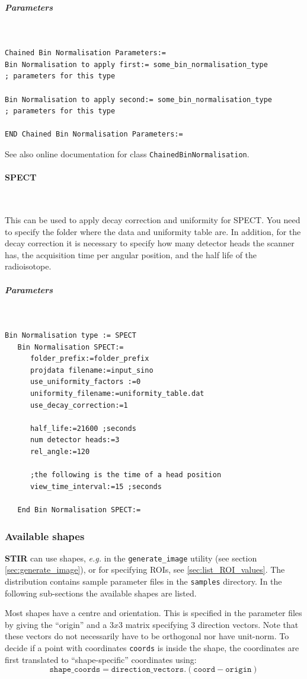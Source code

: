 \documentclass{article}
\newcommand{\subsubsubsection}[1]{\paragraph{#1}\mbox{} \\}
\newcommand{\subsubsubsubsection}[1]{\subparagraph{#1} \mbox{} \\}
\begin{document}
{{{{{{{ \subsubsubsubsection{Parameters}
}
\begin{verbatim}
Chained Bin Normalisation Parameters:=
Bin Normalisation to apply first:= some_bin_normalisation_type
; parameters for this type

Bin Normalisation to apply second:= some_bin_normalisation_type
; parameters for this type

END Chained Bin Normalisation Parameters:=
\end{verbatim}

See also online documentation for class \texttt{ChainedBinNormalisation}.

{ \subsubsubsection{SPECT }
}
\label{sec:SPECTbinnormalisation}
This can be used to apply decay correction and uniformity for SPECT. You need to specify the folder where the data and uniformity table are. In addition, for the decay correction it is necessary to specify how many detector heads the scanner has, the acquisition time per angular position, and  the half life of the radioisotope.

{ \subsubsubsubsection{Parameters}
}
\begin{verbatim}
Bin Normalisation type := SPECT
   Bin Normalisation SPECT:=
      folder_prefix:=folder_prefix
      projdata filename:=input_sino
      use_uniformity_factors :=0
      uniformity_filename:=uniformity_table.dat
      use_decay_correction:=1
     
      half_life:=21600 ;seconds
      num detector heads:=3
      rel_angle:=120
      
      ;the following is the time of a head position
      view_time_interval:=15 ;seconds

   End Bin Normalisation SPECT:=
\end{verbatim}


\subsubsection{
Available shapes}
\label{sec:shapes}
\textbf{STIR} can use shapes, \textit{e.g.} in the \texttt{generate\_image}
utility (see section \ref{sec:generate_image}), or for specifying ROIs, see \ref{sec:list_ROI_values}.
The distribution contains sample parameter files in the
\texttt{samples} directory. In the following sub-sections the available shapes are listed.

Most shapes have a centre and orientation. This is specified in the parameter files
by giving the ``origin'' and a $3x3$ matrix specifying $3$ direction vectors.
Note that these vectors do not necessarily have to be orthogonal nor have unit-norm.
To decide if a point with coordinates \texttt{coords} is inside the shape, the
coordinates are first translated to ``shape-specific'' coordinates using:
\[
\mathtt{shape\_coords} = \mathtt{direction\_vectors}. (\mathtt{coord}-\mathtt{origin})
\]

}}}}}}
\end{document}
